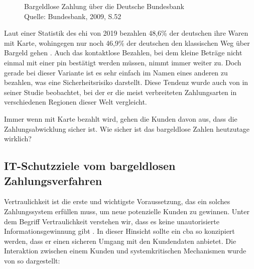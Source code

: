 \begin{figure}[H]
    \caption{Bargeldlose Zahlung über die Deutsche Bundesbank\\ Quelle: Bundesbank, 2009, S.52}
    \label{fig:refrep_DB}
\end{figure}


Laut einer Statistik des \acrfull{ehi} von 2019 bezahlen 48,6\% der deutschen ihre Waren mit Karte, 
wohingegen nur noch 46,9\% der deutschen den klassischen Weg über Bargeld gehen \cite{refart:KSDL} . 
Auch das kontaktlose Bezahlen, bei dem kleine Beträge nicht einmal mit einer \acrfull{pin} bestätigt 
werden müssen, nimmt immer weiter zu. Doch gerade bei dieser Variante ist es sehr einfach im Namen 
eines anderen zu bezahlen, was eine Sicherheitsrisiko darstellt. Diese Tendenz wurde auch von \cite{refart:TDMP} 
in seiner Studie beobachtet, bei der er die meist verbreiteten Zahlungsarten in verschiedenen Regionen
 dieser Welt vergleicht. 


Immer wenn mit Karte bezahlt wird, gehen die Kunden davon aus, dass die Zahlungsabwicklung sicher ist. 
Wie sicher ist das bargeldlose Zahlen heutzutage wirklich? 


\subsection{IT-Schutzziele vom bargeldlosen Zahlungsverfahren}


Vertraulichkeit ist die erste und wichtigste Voraussetzung, das ein solches Zahlungssystem erfüllen muss, 
um neue potenzielle Kunden zu gewinnen. Unter dem Begriff Vertraulichkeit verstehen wir, dass es keine 
unautorisierte Informationsgewinnung gibt \cite{refbook:SWIS}. In dieser Hinsicht sollte ein \acrshort{cba}
so konzipiert werden, dass er einen sicheren Umgang mit den Kundendaten anbietet. Die Interaktion zwischen
einem Kunden und systemkritischen Mechanismen wurde von \cite{refart:HARE} so dargestellt:

